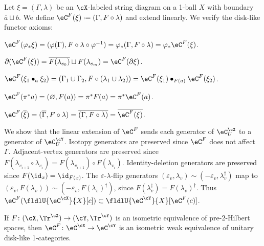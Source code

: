 \documentclass[12pt,reqno]{amsart}
\newcommand{\blt}{\bullet}
\newcommand{\fcj}[1]{\overline{#1}}
\newcommand{\orev}{\overline}
\renewcommand{\amalg}{\sqcup}
\DeclareRobustCommand{\coloneq}{\mathrel{\vcenter{\baselineskip0.5ex\lineskiplimit0pt\hbox{\scriptsize{\upshape.}}\hbox{\scriptsize{\upshape.}}}}=}
\newcommand{\lU}[1]{#1_U}
\begin{document}
\begin{pf}
  Let $\xi =(\Gamma,\lambda)$ be an $\cX$-labeled string diagram on a 1-ball $X$ with boundary $\fcj{a}\amalg b$. We define $\eC^F(\xi) \coloneq (\Gamma,F\circ\lambda)$ and extend linearly. We verify the disk-like functor axioms:
  \begin{lst}
    \item[\ref{1axiom:eF-nat}] $\eC^F(\varphi_*\xi) = (\varphi(\Gamma), F\circ\lambda\circ \varphi^{-1}) = \varphi_*(\Gamma, F\circ\lambda) = \varphi_*\eC^F(\xi)$.
    \item[\ref{1axiom:eF-boundary}] $\partial(\eC^F(\xi))=\fcj{F(\lambda_{e_0})}\amalg F(\lambda_{e_m})=\eC^F(\partial\xi)$.
    \item[\ref{1axiom:eF-gluing}] $\eC^F(\xi_1\blt_a\xi_2)=(\Gamma_1\cup\Gamma_2,F\circ(\lambda_1\cup\lambda_2))=\eC^F(\xi_1)\blt_{F(a)}\eC^F(\xi_2)$.
    \item[\ref{1axiom:eF-products}] $\eC^F(\pi^* a) = (\varnothing, F(a)) = \pi^* F(a) = \pi^* \eC^F(a)$.
    \item[\ref{1axiom:eF-refl}] $\eC^F(\fcj{\xi}) = (\orev{\Gamma}, F \circ \lambda) = \fcj{(\Gamma, F \circ \lambda)} = \fcj{\eC^F(\xi)}$.
    \item[\ref{1axiom:eF-local-relations}] We show that the linear extension of $\eC^F$ sends each generator of $\lU{\eC^\cX}$ to a generator of $\lU{\eC^\cY}$. Isotopy generators are preserved since $\eC^F$ does not affect $\Gamma$. Adjacent-vertex generators are preserved since $F(\lambda_{v_{i+1}}\circ\lambda_{v_i})=F(\lambda_{v_{i+1}})\circ F(\lambda_{v_i})$. Identity-deletion generators are preserved since $F(\id_x)=\id_{F(x)}$. The $\varepsilon$-$\lambda$-flip generators $(\varepsilon_v,\lambda_v)\sim(-\varepsilon_v,\lambda_v^\dag)$ map to $(\varepsilon_v,F(\lambda_v))\sim(-\varepsilon_v,F(\lambda_v)^\dag)$, since $F(\lambda_v^\dag)=F(\lambda_v)^\dag$. Thus $\eC^F(\fldlU{\eC^\cX}{X}[c])\subset\fldlU{\eC^\cY}{X}[\eC^F(c)]$. \qedhere
  \end{lst}
\end{pf}

\begin{lemma}
  \label{lem:C-preserves-equivs}
If $F\colon(\cX,\Tr^\cX)\to(\cY,\Tr^\cY)$ is an isometric equivalence of pre-2-Hilbert spaces, then $\eC^F\colon\eC^\cX\to\eC^\cY$ is an isometric weak equivalence of unitary disk-like 1-categories.
\end{lemma}
\end{document}
